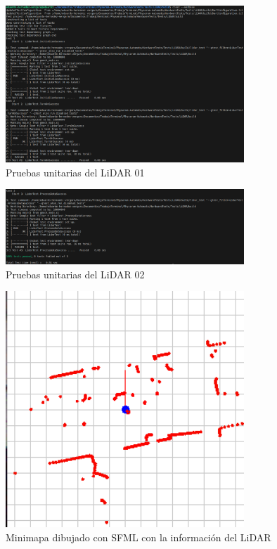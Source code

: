     \vskip 0.5cm
    \begin{figure}[htbp]
        \centering
        \includegraphics[width=0.8\textwidth]{./images/Pruebas/robot/PruebaLidar01-1.png}
        \caption{Pruebas unitarias del LiDAR 01}
        \label{fig:LidarTest1}
    \end{figure}
    \begin{figure}[htbp]
        \centering
        \includegraphics[width=0.8\textwidth]{./images/Pruebas/robot/PruebaLidar01-2.png}
        \caption{Pruebas unitarias del LiDAR 02}
        \label{fig:LidarTest2}
    \end{figure}
    \begin{figure}[htbp]
        \centering
        \includegraphics[width=0.8\textwidth]{./images/Pruebas/robot/LidarSFML01.png}
        \caption{Minimapa dibujado con SFML con la informaci\'on del LiDAR}
        \label{fig:LidarTest2}
    \end{figure}
